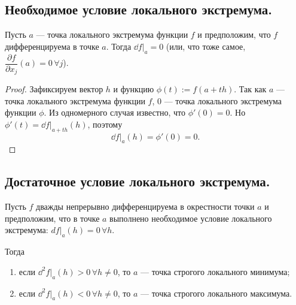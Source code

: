 \documentclass[a4paper]{article}
\theoremstyle{named}
\begin{document}
    \subsection{Необходимое условие локального экстремума.}
    
    \begin{theorem*}
        Пусть $a$ --- точка локального экстремума функции $f$
        и предположим, что $f$ дифференцируема в точке $a$.
        Тогда $\dd f\bigl|_a = 0$ (или, что тоже самое, $\dfrac{\partial f}{\partial x_j}(a)=0\, \forall j$).
    \end{theorem*}
    
    \begin{proof}
        Зафиксируем вектор $h$ и функцию $\phi(t):=f(a+th)$.
        Так как $a$ --- точка локального экстремума функции $f$, $0$ --- точка локального экстремума функции $\phi$.
        Из одномерного случая известно, что	$\phi'(0)=0$. Но $\phi'(t)=\dd f\bigl|_{a+th}(h)$, поэтому
        $$\dd f\bigl|_a(h)=\phi'(0)=0.$$
    \end{proof}
    
    \subsection{Достаточное условие локального экстремума.}
    
    \begin{theorem*}
        Пусть $f$ дважды непрерывно дифференцируема в окрестности точки $a$
        и предположим, что в точке $a$ выполнено необходимое условие локального экстремума:
        $df\bigl|_a(h)=0\, \forall h$.
    
        Тогда
        \begin{enumerate}
        \item
            если $\dd^2f\bigl|_a(h)>0\, \forall h\ne0$, то $a$ --- точка строгого локального минимума;
    
        \item
            если $\dd^2f\bigl|_a(h)<0\, \forall h\ne0$, то $a$ --- точка строгого локального максимума.
        \end{enumerate}
    \end{theorem*}
    
\end{document}
